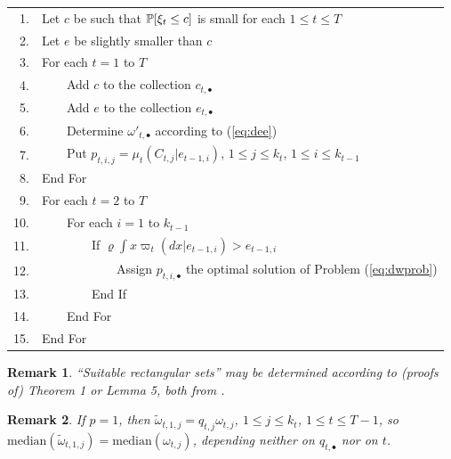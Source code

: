 \documentclass{article}              %
\newtheorem{remark}{Remark}
\begin{document}
\begin{tabular}{r|l}
1. & Let $c$ be such that $\P[\xi_t\leq c]$ is small for each $1\leq t\leq T$

\\ 2. &  Let $e$ be slightly smaller than $c$

\\ 3. &For each $t=1$ to $T$

\\ 4. &$\qquad$Add $c$ to the collection $c_{t,\bullet}$ 

\\ 5. &$\qquad$Add $e$ to the collection $e_{t,\bullet}$ 

\\ 6. &$\qquad$Determine $\omega'_{t,\bullet}$ according to (\ref{eq:dee})

\\ 7. &$\qquad$Put $p_{t,i,j}=\mu_t(C_{t,j}|e_{t-1,i})$, $1\leq j\leq k_t$, $1\leq i\leq k_{t-1}$

\\ 8. &End For

\\ 9. &For each $t=2$ to $T$

\\ 10. &$\qquad$For each $i=1$ to $k_{t-1}$

\\ 11. &$\qquad$$\qquad$If $\varrho\int x \varpi_{t}(dx|e_{t-1,i})> e_{t-1,i}$

\\ 12. &$\qquad$$\qquad$$\qquad$Assign $p_{t,i,\bullet}$ the optimal solution of Problem (\ref{eq:dwprob})

\\ 13. &$\qquad$$\qquad$End If

\\ 14. &$\qquad$End For

\\ 15. &End For
\end{tabular}

\bigskip

\begin{remark} \label{rem:suitable} ``Suitable rectangular sets'' may be determined according to (proofs of) Theorem 1 or Lemma 5, both from \cite{Smid09c}.
\end{remark}


\begin{remark} \label{rem:eforward} If $p=1$, then
$
\tilde{\omega}_{t,1,j}=q_{t,j}\omega_{t,j}
$, $1\leq j\leq k_{t}$, $1\leq t\leq T-1$, so $\mathrm{median}(\tilde{\omega}_{t,1,j})=\mathrm{median}(\omega_{t,j})$, depending neither on $q_{t,\bullet}$ nor on $t$. 
\end{remark}
\end{document}
